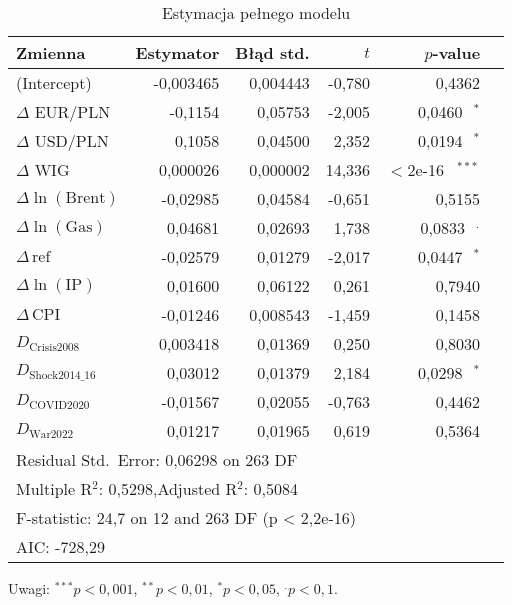 \documentclass[12pt, twoside]{article}
\begin{document}
\begin{table}[ht]
  \centering
  \caption{Estymacja pełnego modelu}
  \label{tab:full_model_simple}
  \begin{tabular}{lrrrrr}
    \toprule
    Zmienna & Estymator & Błąd std. & $t$ & $p$-value & \\
    \midrule
    (Intercept)               & -0,003465 & 0,004443 & -0,780  & 0,4362 & \\
    $\Delta$ EUR/PLN         & -0,1154   & 0,05753  & -2,005  & 0,0460$^{\quad*}$ & \\
    $\Delta$ USD/PLN         &  0,1058   & 0,04500  &  2,352  & 0,0194$^{\quad*}$ & \\
    $\Delta$ WIG             &  0,000026 & 0,000002 & 14,336  & $<$2e-16$^{\quad***}$ & \\
    $\Delta\ln(\mathrm{Brent})$ & -0,02985 & 0,04584  & -0,651  & 0,5155 & \\
    $\Delta\ln(\mathrm{Gas})$ & 0,04681 & 0,02693 & 1,738 & 0,0833$^{\quad.}$ \\
    $\Delta\,\mathrm{ref}$      & -0,02579 & 0,01279  & -2,017  & 0,0447$^{\quad*}$ & \\
    $\Delta\ln(\mathrm{IP})$    &  0,01600 & 0,06122  &  0,261  & 0,7940 & \\
    $\Delta\,\mathrm{CPI}$      & -0,01246 & 0,008543 & -1,459  & 0,1458 & \\
    $D_{\mathrm{Crisis2008}}$    &  0,003418 & 0,01369  &  0,250  & 0,8030 & \\
    $D_{\mathrm{Shock2014\_16}}$ &  0,03012 & 0,01379  &  2,184  & 0,0298$^{\quad*}$ & \\
    $D_{\mathrm{COVID2020}}$     & -0,01567 & 0,02055  & -0,763  & 0,4462 & \\
    $D_{\mathrm{War2022}}$       &  0,01217 & 0,01965  &  0,619  & 0,5364 & \\
    \midrule
    \multicolumn{6}{l}{Residual Std.\ Error: 0,06298 on 263 DF} \\
    \multicolumn{6}{l}{Multiple R$^2$: 0,5298,\quad Adjusted R$^2$: 0,5084} \\
    \multicolumn{6}{l}{F-statistic: 24,7 on 12 and 263 DF (p < 2,2e-16)} \\
    \multicolumn{6}{l}{AIC: -728,29} \\
    \bottomrule
  \end{tabular}
  \begin{tablenotes}
    \small
    \item Uwagi: $^{***}p<0{,}001$, $^{**}p<0{,}01$, $^{*}p<0{,}05$, $^\textbf{.}p<0{,}1$.
  \end{tablenotes}
\end{table}
\end{document}
